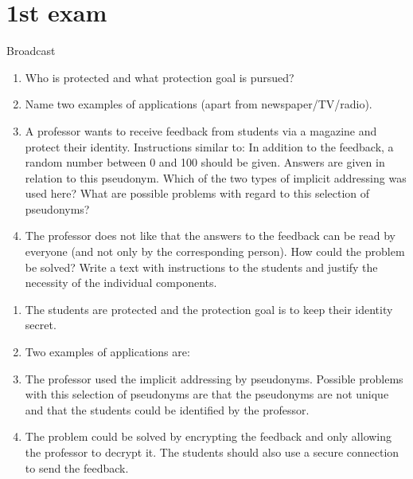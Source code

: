 \documentclass{article}
\begin{document}
\section{1st exam}
\begin{exercise}{Broadcast}
  \begin{enumerate}
    \item Who is protected and what protection goal is pursued?
    \item Name two examples of applications (apart from newspaper/TV/radio).
    \item A professor wants to receive feedback from students via a magazine and protect their identity. Instructions similar to: In addition to the feedback, a random number between 0 and 100 should be given. Answers are given in relation to this pseudonym. Which of the two types of implicit addressing was used here? What are possible problems with regard to this selection of pseudonyms?
    \item The professor does not like that the answers to the feedback can be read by everyone (and not only by the corresponding person). How could the problem be solved? Write a text with instructions to the students and justify the necessity of the individual components.
  \end{enumerate}

  \begin{solution}
    \begin{enumerate}
      \item The students are protected and the protection goal is to keep their identity secret.
      \item Two examples of applications are:
      \item The professor used the implicit addressing by pseudonyms. Possible problems with this selection of pseudonyms are that the pseudonyms are not unique and that the students could be identified by the professor.
      \item The problem could be solved by encrypting the feedback and only allowing the professor to decrypt it. The students should also use a secure connection to send the feedback.
    \end{enumerate}
  \end{solution}
\end{exercise}
\end{document}
